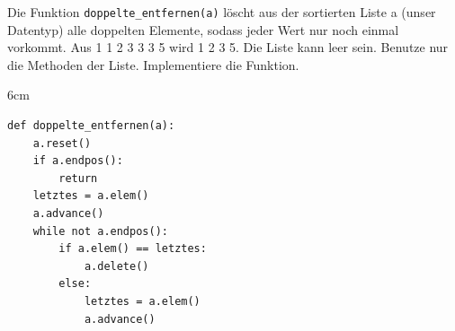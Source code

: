 \question[4]
Die Funktion \texttt{doppelte\_entfernen(a)} löscht aus der sortierten Liste a (unser Datentyp) alle doppelten Elemente, sodass jeder
Wert nur noch einmal vorkommt. Aus 1 1 2 3 3 3 5 wird 1 2 3 5. Die Liste kann leer sein.
Benutze nur die Methoden der Liste. Implementiere die Funktion.
\begin{solutionbox}{6cm}
\begin{lstlisting}
def doppelte_entfernen(a):
    a.reset()
    if a.endpos():
        return
    letztes = a.elem()
    a.advance()
    while not a.endpos():
        if a.elem() == letztes:
            a.delete()
        else:
            letztes = a.elem()
            a.advance()
\end{lstlisting}
\end{solutionbox}

